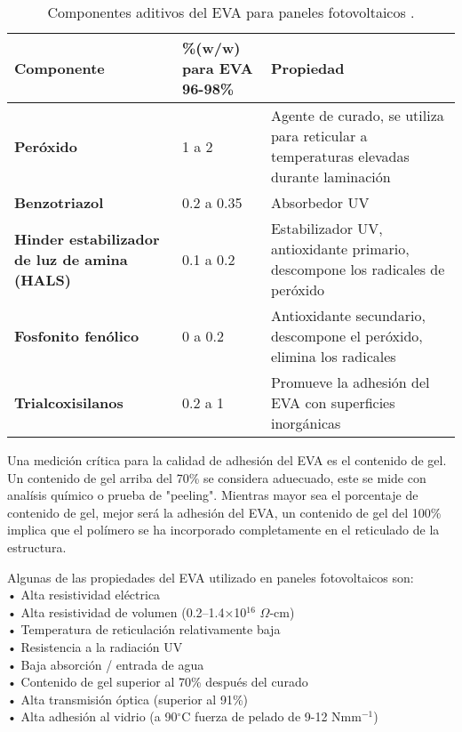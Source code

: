 \begin{table}[htb]
	\caption{Componentes aditivos del EVA para paneles fotovoltaicos \citep{Olivera2017}.}
	\vspace{-0.5em} %
	\label{tab:AdhitivosEVA}
	\begin{center}
		\begin{tabular}{|p{4cm}||p{4cm}|p{5cm}|}\hline
			\textbf{Componente} & \textbf{\%(w/w) para EVA 96-98\%} & \textbf{Propiedad}\\ \hline
			\textbf{Peróxido} & 1 a 2 & Agente de curado, se utiliza para reticular a temperaturas elevadas durante laminación \\ \hline
			\textbf{Benzotriazol} & 0.2 a 0.35 & Absorbedor UV\\ \hline
			\textbf{Hinder estabilizador de luz de amina (HALS)} & 0.1 a 0.2 & Estabilizador UV, antioxidante primario, descompone los radicales de peróxido\\ \hline
			\textbf{Fosfonito fenólico} & 0 a 0.2 & Antioxidante secundario, descompone el peróxido, elimina los radicales\\ \hline
			\textbf{Trialcoxisilanos} & 0.2 a 1 & Promueve la adhesión del EVA con superficies inorgánicas\\ \hline	
		\end{tabular}
	\end{center}
\end{table} 

Una medición crítica para la calidad de adhesión del EVA es el contenido de gel. Un contenido de gel arriba del 70\% se considera aduecuado, este se mide con analísis químico o prueba de "peeling". Mientras mayor sea el porcentaje de contenido de gel, mejor será la adhesión del EVA, un contenido de gel del 100\% implica que el polímero se ha incorporado completamente en el reticulado de la estructura\citep{Olivera2017}.

Algunas de las propiedades del EVA utilizado en paneles fotovoltaicos son: \\
•	Alta resistividad eléctrica\\ 
•	Alta resistividad de volumen (0.2–1.4×10$^{16}$ $\Omega$-cm) \\
•	Temperatura de reticulación relativamente baja\\
•	Resistencia a la radiación UV\\
•   Baja absorción / entrada de agua\\
•	Contenido de gel superior al 70\% después del curado\\
•	Alta transmisión óptica (superior al 91\%)\\
•	Alta adhesión al vidrio (a 90$^{\circ}$C fuerza de pelado de 9-12 Nmm$^{-1}$)\\

